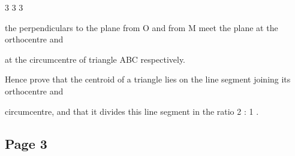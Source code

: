 \documentclass[12pt]{article}
\begin{document}
\begin{flushleft}
3 3 3\par
the perpendiculars to the plane from O and from M meet the plane at the orthocentre and\par
at the circumcentre of triangle ABC respectively.\par
Hence prove that the centroid of a triangle lies on the line segment joining its orthocentre and\par
circumcentre, and that it divides this line segment in the ratio 2 : 1 .\par
[The orthocentre of a triangle is the point at which the three altitudes intersect; the circum-\par
centre of a triangle is the point equidistant from the three vertices.]\par
\end{flushleft}
\subsection*{Page 3}
\end{document}
